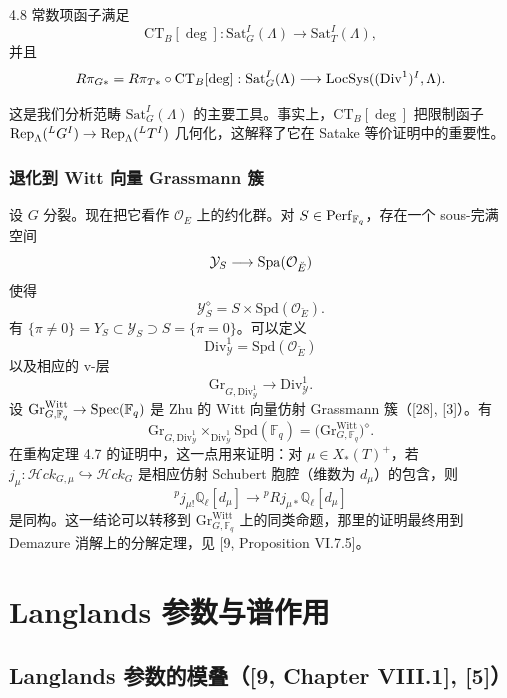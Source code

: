 \begin{thm}{4.8}
常数项函子满足
\[
\mathrm{CT}_{B}[\deg]:\mathrm{Sat}^{I}_{G}(\Lambda)\longrightarrow\mathrm{Sat}^{I}_{T}(\Lambda),
\]
并且
\[
R\pi_{G*}=R\pi_{T*}\circ\mathrm{CT}_{B}[\deg]:\mathrm{Sat}^{I}_{G}(\Lambda)\longrightarrow\operatorname{LocSys}((\mathrm{Div}^{1})^{I},\Lambda).
\]
\label{thm:a3-4-8}
\end{thm}

这是我们分析范畴 $\mathrm{Sat}^{I}_{G}(\Lambda)$ 的主要工具。事实上，$\mathrm{CT}_{B}[\deg]$ 把限制函子 $\operatorname{Rep}_{\Lambda}({}^{L}G^{I})\to\operatorname{Rep}_{\Lambda}({}^{L}T^{I})$ 几何化，这解释了它在 Satake 等价证明中的重要性。

\subsubsection{退化到 Witt 向量 Grassmann 簇}
设 $G$ 分裂。现在把它看作 $\mathcal{O}_{E}$ 上的约化群。对 $S\in\operatorname{Perf}_{\mathbb{F}_{q}}$，存在一个 sous-完满 空间
\[
\mathcal{Y}_{S}\longrightarrow\operatorname{Spa}(\mathcal{O}_{\breve{E}})
\]
使得
\[
\mathcal{Y}_{S}^{\diamond}=S\times\mathrm{Spd}(\mathcal{O}_{\breve{E}}).
\]
有 $\{\pi\ne0\}=Y_{S}\subset\mathcal{Y}_{S}\supset S=\{\pi=0\}$。可以定义
\[
\mathrm{Div}^{1}_{\mathcal{Y}}=\mathrm{Spd}(\mathcal{O}_{\breve{E}})
\]
以及相应的 v-层
\[
\mathrm{Gr}_{G,\mathrm{Div}^{1}_{\mathcal{Y}}}\longrightarrow\mathrm{Div}^{1}_{\mathcal{Y}}.
\]
设 $\mathrm{Gr}^{\mathrm{Witt}}_{G,\mathbb{F}_{q}}\to\operatorname{Spec}(\mathbb{F}_{q})$ 是 Zhu 的 Witt 向量仿射 Grassmann 簇（[28], [3]）。有
\[
\mathrm{Gr}_{G,\mathrm{Div}^{1}_{\mathcal{Y}}}\times_{\mathrm{Div}^{1}_{\mathcal{Y}}}\mathrm{Spd}(\mathbb{F}_{q})=\bigl(\mathrm{Gr}^{\mathrm{Witt}}_{G,\mathbb{F}_{q}}\bigr)^{\diamond}.
\]
在重构定理 4.7 的证明中，这一点用来证明：对 $\mu\in X_{*}(T)^{+}$，若 $j_{\mu}:\mathcal{H}ck_{G,\mu}\hookrightarrow\mathcal{H}ck_{G}$ 是相应仿射 Schubert 胞腔（维数为 $d_{\mu}$）的包含，则
\[
{}^{p}j_{\mu!}\mathbb{Q}_{\ell}[d_{\mu}]\longrightarrow{}^{p}Rj_{\mu*}\mathbb{Q}_{\ell}[d_{\mu}]
\]
是同构。这一结论可以转移到 $\mathrm{Gr}^{\mathrm{Witt}}_{G,\mathbb{F}_{q}}$ 上的同类命题，那里的证明最终用到 Demazure 消解上的分解定理，见 [9, Proposition VI.7.5]。

\section{Langlands 参数与谱作用}
\subsection{Langlands 参数的模叠（[9, Chapter VIII.1], [5]）}
